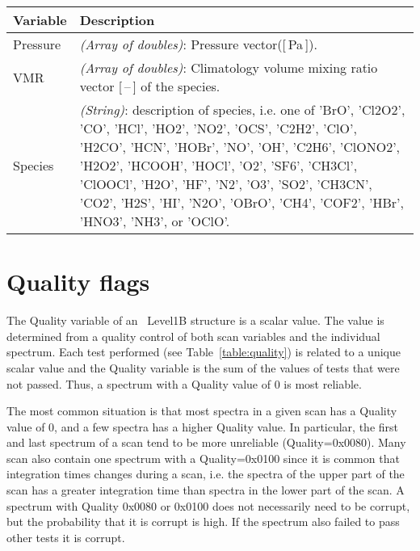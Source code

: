 \begin{table}
\caption{ \smr\ \textit{a priori} data format. 
Example URL: \url{http://malachite.rss.chalmers.se/rest_api/v4/apriori/O3/2015-01-03/AC1/2/7002887494/} }
\label{table:aprioridataformat}
\begin{longtable}{| p{} | p{} |}
\hline
  \textbf{Variable} & \textbf{Description} \\ \hline
    Pressure        & \emph{(Array of doubles)}: Pressure vector([\,Pa\,]).            \\ \hline
    VMR             & \emph{(Array of doubles)}: Climatology volume mixing ratio vector [\,--\,] of the species.  \\ \hline
    Species         & \emph{(String)}: description of species, i.e. one of 'BrO', 'Cl2O2', 'CO', 'HCl', 'HO2', 'NO2',
                      'OCS', 'C2H2', 'ClO', 'H2CO', 'HCN', 'HOBr', 'NO', 'OH', 'C2H6', 'ClONO2', 'H2O2',
                      'HCOOH', 'HOCl', 'O2', 'SF6', 'CH3Cl', 'ClOOCl', 'H2O', 'HF', 'N2', 'O3', 'SO2',
                      'CH3CN', 'CO2', 'H2S', 'HI', 'N2O', 'OBrO', 'CH4', 'COF2', 'HBr', 'HNO3', 'NH3', or 'OClO'.\\ \hline
\hline
\end{longtable}
\end{table}
\addtocounter{table}{-1}


\section{Quality flags}

The Quality variable of an \smr\ Level1B structure is a scalar value.
The value is determined from a quality control
of both scan variables and the individual spectrum.
Each test performed (see Table~\ref{table:quality}) is related to a unique scalar value
and the Quality variable is the sum of the values of tests 
that were not passed.  
Thus, a spectrum with a Quality value of 0 is most reliable.

The most common situation is that most spectra in a given scan has 
a Quality value of 0, and a few spectra has a higher Quality value.
In particular, the first and last spectrum of a scan tend to be more
unreliable (Quality=0x0080).  
Many scan also contain one spectrum with a Quality=0x0100
since it is common that integration times changes during a scan,
i.e. the spectra of the upper part of the scan has a greater integration 
time than spectra in the lower part of the scan.
A spectrum with Quality 0x0080 or 0x0100 does not necessarily need
to be corrupt, but the probability that it is corrupt is high.  
If the spectrum also failed to pass other tests it is corrupt. 

